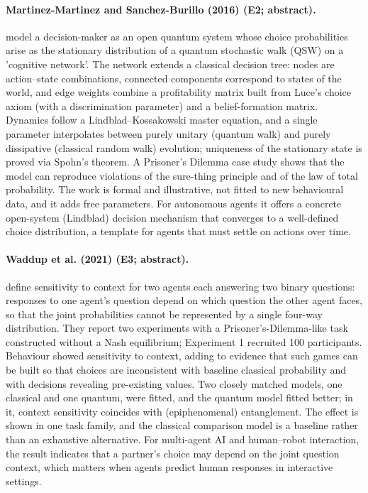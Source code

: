 \documentclass[10pt,a4paper]{article}
\begin{document}
\paragraph{Martinez-Martinez and Sanchez-Burillo (2016) (E2; abstract).} \citet{MartinezMartinez2016} model a decision-maker as an open quantum system whose choice probabilities arise as the stationary distribution of a quantum stochastic walk (QSW) on a 'cognitive network'. The network extends a classical decision tree: nodes are action--state combinations, connected components correspond to states of the world, and edge weights combine a profitability matrix built from Luce's choice axiom (with a discrimination parameter) and a belief-formation matrix. Dynamics follow a Lindblad--Kossakowski master equation, and a single parameter interpolates between purely unitary (quantum walk) and purely dissipative (classical random walk) evolution; uniqueness of the stationary state is proved via Spohn's theorem. A Prisoner's Dilemma case study shows that the model can reproduce violations of the sure-thing principle and of the law of total probability. The work is formal and illustrative, not fitted to new behavioural data, and it adds free parameters. For autonomous agents it offers a concrete open-system (Lindblad) decision mechanism that converges to a well-defined choice distribution, a template for agents that must settle on actions over time.

\paragraph{Waddup et al. (2021) (E3; abstract).} \citet{Waddup2021} define sensitivity to context for two agents each answering two binary questions: responses to one agent's question depend on which question the other agent faces, so that the joint probabilities cannot be represented by a single four-way distribution. They report two experiments with a Prisoner's-Dilemma-like task constructed without a Nash equilibrium; Experiment 1 recruited 100 participants. Behaviour showed sensitivity to context, adding to evidence that such games can be built so that choices are inconsistent with baseline classical probability and with decisions revealing pre-existing values. Two closely matched models, one classical and one quantum, were fitted, and the quantum model fitted better; in it, context sensitivity coincides with (epiphenomenal) entanglement. The effect is shown in one task family, and the classical comparison model is a baseline rather than an exhaustive alternative. For multi-agent AI and human--robot interaction, the result indicates that a partner's choice may depend on the joint question context, which matters when agents predict human responses in interactive settings.
\end{document}
